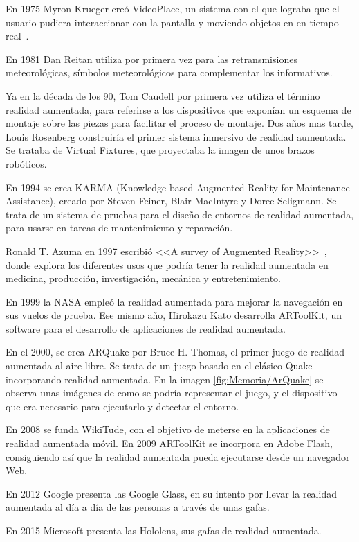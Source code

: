 
En 1975 Myron Krueger creó VideoPlace, un sistema con el que lograba que el usuario pudiera interaccionar con la pantalla y moviendo objetos en en tiempo real~\cite{ARevolution}.



En 1981 Dan Reitan utiliza por primera vez para las retransmisiones meteorológicas, símbolos meteorológicos para complementar los informativos.

Ya en la década de los 90, Tom Caudell por primera vez utiliza el término realidad aumentada, para referirse a los dispositivos que exponían un esquema de montaje sobre las piezas para facilitar el proceso de montaje. 
Dos años mas tarde, Louis Rosenberg construiría el primer sistema inmersivo de realidad aumentada.  Se trataba de Virtual Fixtures, que proyectaba la imagen de unos brazos robóticos.

En 1994 se crea KARMA (Knowledge based Augmented Reality for Maintenance Assistance), creado por  Steven Feiner, Blair MacIntyre y Doree Seligmann. Se trata de un sistema de pruebas para el diseño de entornos de realidad aumentada, para usarse en tareas de mantenimiento y reparación.

Ronald T. Azuma  en 1997 escribió <<A survey of Augmented Reality>>~\cite{azuma1997survey}, donde explora los diferentes usos que podría tener la realidad aumentada en medicina, producción, investigación, mecánica y entretenimiento.

En 1999 la NASA empleó la realidad aumentada para mejorar la navegación en sus vuelos de prueba. Ese mismo año, Hirokazu Kato desarrolla ARToolKit, un software para el desarrollo de aplicaciones de realidad aumentada.



En el 2000, se crea ARQuake por Bruce H. Thomas, el primer juego de realidad aumentada al aire libre. Se trata de un juego basado en el clásico Quake incorporando realidad aumentada. En la imagen \ref{fig:Memoria/ArQuake} se observa unas imágenes de como se podría representar el juego, y el dispositivo que era necesario para ejecutarlo y detectar el entorno.


En 2008 se funda WikiTude, con el objetivo de meterse en la aplicaciones de realidad aumentada móvil. 
En 2009 ARToolKit se incorpora en Adobe Flash, consiguiendo así que la realidad aumentada pueda ejecutarse desde un navegador Web.

En 2012 Google presenta las Google Glass, en su intento por llevar la realidad aumentada al día a día de las personas a través de unas gafas.  

En 2015 Microsoft presenta las Hololens, sus gafas de realidad aumentada.





	
	
	
